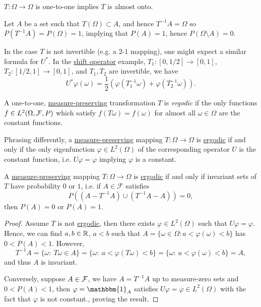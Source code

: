 \begin{remark}
	\(T\colon \Omega \to \Omega\) is one-to-one implies \(T\) is almost onto.
\end{remark}
\begin{explanation}
	Let \(A\) be a set such that \(T(\Omega) \subset A\), and hence \(T^{-1} A = \Omega\) so \(P(T^{-1}A) = P(\Omega) = 1\), implying that \(P(A) = 1\), hence \(P(\Omega \setminus A) = 0\).
\end{explanation}

In the case \(T\) is not invertible (e.g. a \(2\)-\(1\) mapping), one might expect a similar formula for \(U^{\ast}\). In the \hyperref[eg:shift-op]{shift operator} example, \(T_1\colon [0, 1 / 2] \to [0,1]\), \(T_2\colon [1 / 2, 1] \to [0,1]\), and \(T_1, T_2\) are invertible, we have
\[
	U^{\ast} \varphi(\omega) = \frac{1}{2}\left( \varphi(T_1^{-1} \omega) + \varphi(T_2^{-1} \omega) \right) .
\]

\begin{definition}\label{def:ergodic-transformation}
	A one-to-one, \hyperref[def:measure-preserving]{measure-preserving} transformation \(T\) is \emph{ergodic} if the only functions \(f\in L^2 (\Omega , \mathcal{\MakeUppercase{f}} , P)\) which satisfy \(f(T \omega ) = f(\omega )\) for almost all \(\omega \in \Omega \) are the constant functions.
\end{definition}
\begin{remark}[Eigenfunction]
	Phrasing differently, a \hyperref[def:measure-preserving]{measure-preserving} mapping \(T\colon \Omega \to \Omega\) is \hyperref[def:ergodic-transformation]{ergodic} if and only if the only eigenfunction \(\varphi \in L^2(\Omega)\) of the corresponding operator \(U\) is the constant function, i.e. \(U \varphi = \varphi\) implying \(\varphi\) is a constant.
\end{remark}

\begin{lemma}
	A \hyperref[def:measure-preserving]{measure-preserving} mapping \(T\colon \Omega \to \Omega\) is \hyperref[def:ergodic-transformation]{ergodic} if and only if invariant sets of \(T\) have probability \(0\) or \(1\), i.e. if \(A \in \mathcal{F}\) satisfies
	\[
		P((A - T^{-1} A) \cup (T^{-1} A - A)) = 0,
	\]
	then \(P(A) = 0\) or \(P(A) = 1\).
\end{lemma}
\begin{proof}
	Assume \(T\) is not \hyperref[def:ergodic-transformation]{ergodic}, then there exists \(\varphi \in L^2(\Omega)\) such that \(U \varphi = \varphi\). Hence, we can find \(a,b \in \mathbb{\MakeUppercase{r}}\), \(a < b\) such that \(A = \{\omega \in \Omega\colon a < \varphi(\omega) < b\}\) has \(0 < P(A) < 1\). However,
	\[
		T^{-1}A  = \{\omega:\ T \omega \in A\}
		= \{\omega:\ a < \varphi(T \omega) < b\}
		= \{\omega:\ a < \varphi(\omega) < b\} = A,
	\]
	and thus \(A\) is invariant.

	Conversely, suppose \(A \in \mathcal{\MakeUppercase{f}}\), we have \(A = T^{-1}A\) up to measure-zero sets and \(0 < P(A) < 1\), then \(\varphi = \mathbbm{1}_A\) satisfies \(U \varphi = \varphi \in L^2(\Omega)\) with the fact that \(\varphi\) is not constant., proving the result.
\end{proof}

